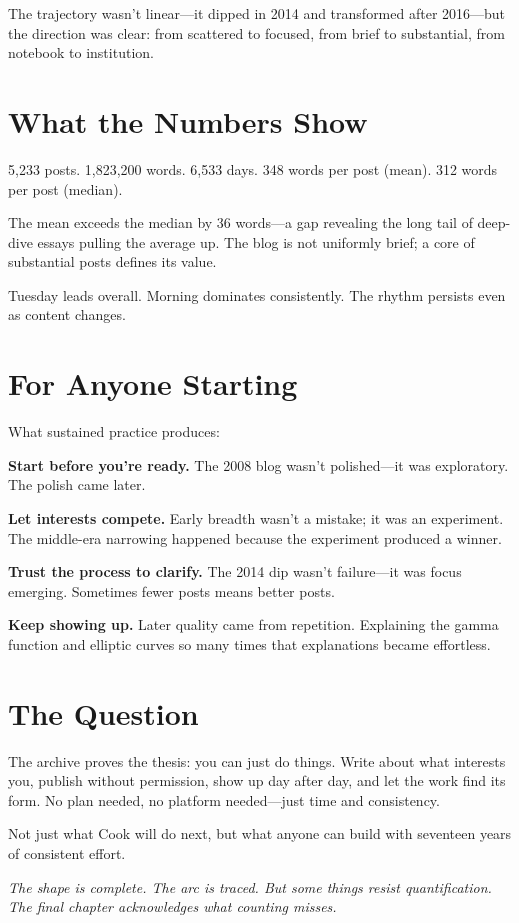 The trajectory wasn't linear---it dipped in 2014 and transformed after 2016---but the direction was clear: from scattered to focused, from brief to substantial, from notebook to institution.

\bigskip

\section*{What the Numbers Show}

5,233 posts.
1,823,200 words.
6,533 days.
348 words per post (mean).
312 words per post (median).

The mean exceeds the median by 36 words---a gap revealing the long tail of deep-dive essays pulling the average up. The blog is not uniformly brief; a core of substantial posts defines its value.

Tuesday leads overall. Morning dominates consistently. The rhythm persists even as content changes.

\bigskip

\section*{For Anyone Starting}

What sustained practice produces:

\textbf{Start before you're ready.} The 2008 blog wasn't polished---it was exploratory. The polish came later.

\textbf{Let interests compete.} Early breadth wasn't a mistake; it was an experiment. The middle-era narrowing happened because the experiment produced a winner.

\textbf{Trust the process to clarify.} The 2014 dip wasn't failure---it was focus emerging. Sometimes fewer posts means better posts.

\textbf{Keep showing up.} Later quality came from repetition. Explaining the gamma function and elliptic curves so many times that explanations became effortless.

\bigskip

\section*{The Question}

The archive proves the thesis: you can just do things. Write about what interests you, publish without permission, show up day after day, and let the work find its form. No plan needed, no platform needed---just time and consistency.

Not just what Cook will do next, but what anyone can build with seventeen years of consistent effort.

\bigskip

\textit{The shape is complete. The arc is traced. But some things resist quantification. The final chapter acknowledges what counting misses.}

